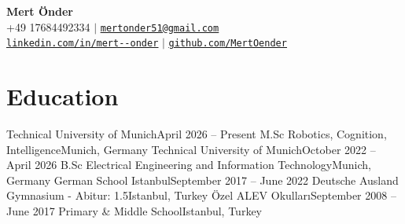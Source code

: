 \documentclass[a4paper,11pt]{article}
\begin{document}
\begin{center}
    { \textbf{\Huge Mert Önder}} \\ \vspace{3pt}
   \small +49 17684492334 $|$ \underline{\href{mailto:mertonder51@gmail.com}{\nolinkurl{mertonder51@gmail.com}}} \\ \underline{\href{https://www.linkedin.com/in/mert--onder/}{\nolinkurl{linkedin.com/in/mert--onder}}} $|$ \underline{\href{https://github.com/MertOender}{\nolinkurl{github.com/MertOender}}}
\end{center}




\section{Education}
\resumeSubHeadingListStart

    \resumeSubheading
{Technical University of Munich}{April 2026 -- Present}
        {M.Sc Robotics, Cognition, Intelligence}{Munich, Germany}
       \vspace{0.1cm}
    \resumeSubheading
{Technical University of Munich}{October 2022 -- April 2026}
        {B.Sc Electrical Engineering and Information Technology}{Munich, Germany} 
        \resumeItemListStart
       \small{}
       \vspace{0.05cm}
       \resumeItemListEnd
       \vspace{0.1cm}
    \resumeSubheading
        {German School Istanbul}{September 2017 -- June 2022}
        {Deutsche Ausland Gymnasium - Abitur: 1.5}{Istanbul, Turkey}
        \vspace{0.1cm}
    \resumeSubheading
        {Özel ALEV Okulları}{September 2008 -- June 2017}
        {Primary \& Middle School}{Istanbul, Turkey}
        \resumeItemListStart
       \small{}
        \resumeItemListEnd

\resumeSubHeadingListEnd
\end{document}
